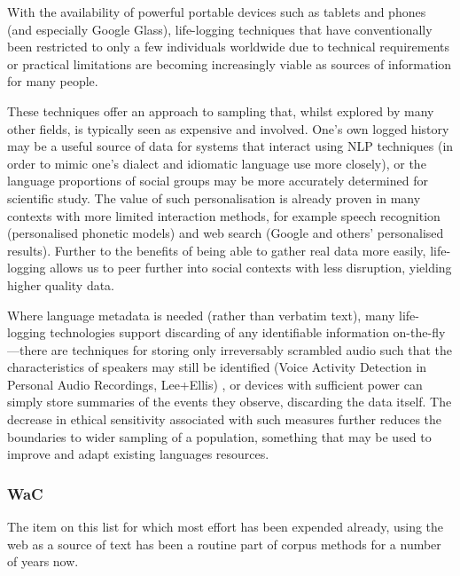 With the availability of powerful portable devices such as tablets and phones (and especially Google Glass), life-logging techniques that have conventionally been restricted to only a few individuals worldwide due to technical requirements or practical limitations are becoming increasingly viable as sources of information for many people. 

These techniques offer an approach to sampling that, whilst explored by many other fields, is typically seen as expensive and involved.  One's own logged history may be a useful source of data for systems that interact using NLP techniques (in order to mimic one's dialect and idiomatic language use more closely), or the language proportions of social groups may be more accurately determined for scientific study.  The value of such personalisation is already proven in many contexts with more limited interaction methods, for example speech recognition (personalised phonetic models) and web search (Google and others' personalised results).  Further to the benefits of being able to gather real data more easily, life-logging allows us to peer further into social contexts with less disruption, yielding higher quality data.

Where language metadata is needed (rather than verbatim text), many life-logging technologies support discarding of any identifiable information on-the-fly---there are techniques for storing only irreversably scrambled audio such that the characteristics of speakers may still be identified (Voice Activity Detection in Personal Audio Recordings, Lee+Ellis)%
, or devices with sufficient power can simply store summaries of the events they observe, discarding the data itself.
The decrease in ethical sensitivity associated with such measures further reduces the boundaries to wider sampling of a population, something that may be used to improve and adapt existing languages resources.






\subsubsection{WaC}
The item on this list for which most effort has been expended already, using the web as a source of text has been a routine part of corpus methods for a number of years now.

